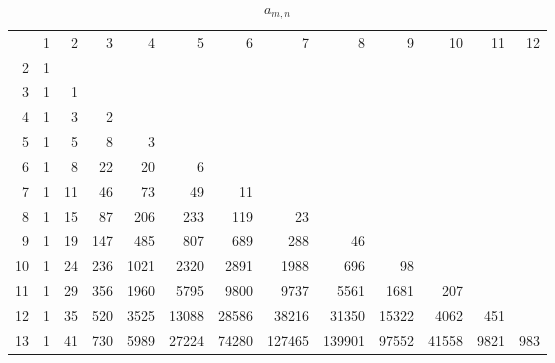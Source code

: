 \documentclass[10pt]{amsart}
\begin{document}
\begin{table}[h]
    {\scriptsize \begin{tabular}{|r|rrrrrrrrrrrr|} \hline
    & 1 & 2 & 3 & 4 & 5 & 6 & 7 & 8 & 9 & 10 & 11 & 12 \\
    2 & 1 &&&&&&&&&&& \\
    3 & 1 & 1 &&&&&&&&&& \\
    4 & 1 & 3 & 2 &&&&&&&&& \\
    5 & 1 & 5 & 8 & 3 &&&&&&&& \\
    6 & 1 & 8 & 22 & 20 & 6 &&&&&&& \\
    7 & 1 & 11 & 46 & 73 & 49 & 11 &&&&&& \\
    8 & 1 & 15 & 87 & 206 & 233 & 119 & 23 &&&&& \\
    9 & 1 & 19 & 147 & 485 & 807 & 689 & 288 & 46 &&&& \\
    10 & 1 & 24 & 236 & 1021 & 2320 & 2891 & 1988 & 696 & 98 &&& \\
    11 & 1 & 29 & 356 & 1960 & 5795 & 9800 & 9737 & 5561 & 1681 & 207 && \\
    12 & 1 & 35 & 520 & 3525 & 13088 & 28586 & 38216 & 31350 & 15322 & 4062 & 451 & \\
    13 & 1 & 41 & 730 & 5989 & 27224 & 74280 & 127465 & 139901 & 97552 & 41558 & 9821 & 983 \\ \hline
    
    
    \end{tabular}}
    \vspace{.2cm}
    \caption{$a_{m,n}$}
    \label{a-mn}
    \end{table}
    
\end{document}
